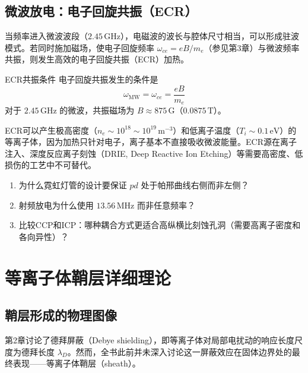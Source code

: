 \documentclass[12pt,a4paper,openany,oneside]{book}
\newcommand{\difficulty}[1]{\marginnote{\hfill\textcolor{coverMid!80}{\rule[-0.1em]{2pt}{0.9em}}\,\textcolor{coverMid}{\footnotesize\textbf{[#1]}}}}
\begin{document}
\subsection{微波放电：电子回旋共振（ECR）}

当频率进入微波波段（$2.45\,\mathrm{GHz}$），电磁波的波长与腔体尺寸相当，可以形成驻波模式。若同时施加磁场，使电子回旋频率 $\omega_{ce} = eB/m_e$（参见第3章）与微波频率共振，则发生高效的电子回旋共振（ECR）加热。

\begin{theorem}{ECR共振条件}{}{}
\label{thm:ecr-condition}
电子回旋共振发生的条件是
\begin{equation}
\label{eq:ecr-condition}
\omega_{\text{MW}} = \omega_{ce} = \frac{eB}{m_e}
\end{equation}
对于 $2.45\,\mathrm{GHz}$ 的微波，共振磁场为 $B \approx 875\,\mathrm{G}$（$0.0875\,\mathrm{T}$）。
\end{theorem}

\begin{insight}{}{}
ECR可以产生极高密度（$n_e \sim 10^{18}\sim 10^{19}\,\mathrm{m^{-3}}$）和低离子温度（$T_i \sim 0.1\,\mathrm{eV}$）的等离子体，因为加热只针对电子，离子基本不直接吸收微波能量。ECR源在离子注入、深度反应离子刻蚀（DRIE, Deep Reactive Ion Etching）等需要高密度、低损伤的工艺中不可替代。
\end{insight}

\begin{miniquiz}
\begin{enumerate}
\item 为什么霓虹灯管的设计要保证 $pd$ 处于帕邢曲线右侧而非左侧？
\item 射频放电为什么使用 $13.56\,\mathrm{MHz}$ 而非任意频率？
\item 比较CCP和ICP：哪种耦合方式更适合高纵横比刻蚀孔洞（需要高离子密度和各向异性）？
\end{enumerate}
\end{miniquiz}

\section{等离子体鞘层详细理论}
\difficulty{提高}

\subsection{鞘层形成的物理图像}

第2章讨论了德拜屏蔽（Debye shielding），即等离子体对局部电扰动的响应长度尺度为德拜长度 $\lambda_D$。然而，全书此前并未深入讨论这一屏蔽效应在固体边界处的最终表现——等离子体鞘层（sheath）。
\end{document}
